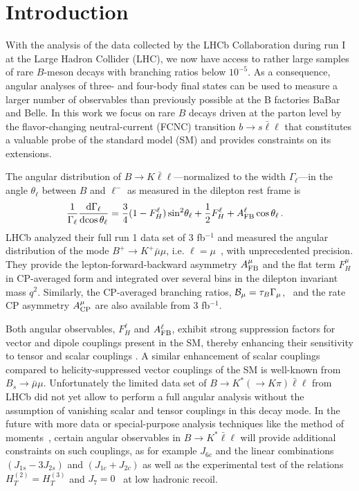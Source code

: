 \documentclass[twocolumn,epjc3]{svjour3}
\numberwithin{equation}{section}
\newcommand{\checked}[1]{{\color{brown}{ {\bf Checked: }{#1}}}}
\renewcommand{\checked}[1]{#1}
\renewcommand{\[}{\big[}
\renewcommand{\]}{\big]}
\renewcommand{\(}{\big(}
\renewcommand{\)}{\big)}
\begin{document}
%
%
%
\section{
 \checked{ Introduction}
}

With the analysis of the data collected by the LHCb Collaboration
during run I at the Large Hadron Collider (LHC), we now have access to
rather large samples of rare $B$-meson decays with branching ratios
below $10^{-5}$. As a consequence, angular analyses of three- and
four-body final states can be used to measure a larger number of
observables than previously possible at the B factories BaBar and
Belle. In this work we focus on rare $B$ decays driven at the parton
level by the flavor-changing neutral-current (FCNC) transition $b\to s
\bar\ell\ell$ that constitutes a valuable probe of the standard model
(SM) and provides constraints on its extensions.

The angular distribution of $B\to K \bar\ell\ell$---normalized to the
width $\Gamma_\ell$---in the angle $\theta_\ell$ between $B$ and
$\ell^-$ as measured in the dilepton rest frame is
\begin{align}
  \label{eq:ang-distr}
  \frac{1}{\Gamma_\ell} \frac{\mbox{d}\Gamma_{\ell}}{\mbox{d}\!\cos\theta_\ell} &
  = \frac{3}{4} (1 - F_H^\ell) \sin^2\!\theta_\ell
  + \frac{1}{2} F_H^\ell
  + A_{\rm FB}^\ell \cos\theta_\ell \,.
\end{align}
LHCb analyzed their full run 1 data set of 3 fb$^{-1}$ and measured the angular
distribution of the mode $B^+\to K^+ \bar\mu\mu$, i.e. $\ell =
\mu$~\cite{Aaij:2014tfa}, with unprecedented precision. They provide the
lepton-forward-backward asymmetry $A_{\rm FB}^\mu$ and the flat term $F_H^\mu$
in CP-averaged form and integrated over several bins in the dilepton invariant
mass $q^2$. Similarly, the CP-averaged branching ratios, ${\cal B}_\mu =
\tau_{B} \Gamma_\mu$,~\cite{Aaij:2014pli} and the rate CP asymmetry $A_{\rm
  CP}^\mu$ \cite{Aaij:2014bsa} are also available from 3 fb$^{-1}$.

Both {angular} observables, $F_H^\ell$ and $A_{\rm FB}^\ell$, exhibit strong suppression
factors for vector and dipole couplings present in the SM, thereby enhancing
their sensitivity to tensor and scalar couplings \cite{Bobeth:2007dw,
  Bobeth:2012vn}. A similar enhancement of scalar couplings compared to
helicity-suppressed vector couplings of the SM is well-known from $B_s\to
\bar\mu\mu$. Unfortunately the limited data set of $B\to K^*(\to K\pi)
\bar\ell\ell$ from LHCb \cite{Aaij:2013qta} {did not yet} allow to perform a full
angular analysis without the assumption of vanishing scalar and tensor couplings
in this decay mode. In the future with more data or special-purpose analysis
techniques like the method of moments~\cite{beaujean:2015mom}, certain angular
observables in $B\to K^* \bar\ell\ell$ will provide additional constraints on
such couplings, as for example $J_{6c}$ \cite{Altmannshofer:2008dz} and the
linear combinations $(J_{1s} - 3 J_{2s})$ and $(J_{1c} + J_{2c})$
\cite{Matias:2012xw, Bobeth:2012vn} as well as the experimental test of the
relations $H_T^{(2)} = H_T^{(3)}$ and $J_7 = 0$~\cite{Bobeth:2012vn} at low
hadronic recoil.
\end{document}
